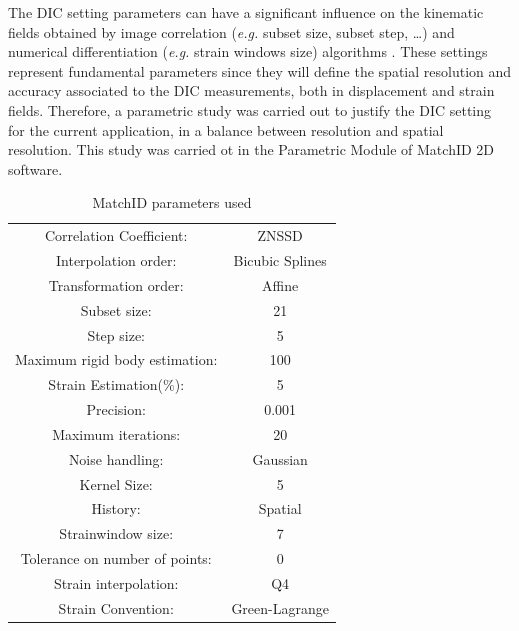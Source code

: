 \documentclass[3p,times,procedia]{elsarticle}
\begin{document}
The DIC setting parameters can have a significant influence on the kinematic fields obtained by image correlation (\textit{e.g.} subset size, subset step, \ldots) and numerical differentiation (\textit{e.g.} strain windows size) algorithms \cite{Pereira2018566}. These settings represent fundamental parameters since they will define the spatial resolution and accuracy associated to the DIC measurements, both in displacement and strain fields.  Therefore, a parametric study was carried out to justify the DIC setting for the current
application, in a balance between resolution and spatial resolution. This study was carried ot in the Parametric Module of MatchID 2D software.
\begin{table}[]
	\centering
	\begin{tabular}{c c}
		\hline
		Correlation   Coefficient: & ZNSSD \\ 
		Interpolation order: & Bicubic Splines \\ 
		Transformation order: & Affine \\
		Subset size: & 21 \\
		Step size: & 5 \\
		Maximum rigid body estimation: & 100 \\ 
		Strain Estimation(\%): & 5 \\ 
		Precision: & 0.001 \\ 
		Maximum iterations: & 20 \\ 
		Noise handling: & Gaussian \\ 
		Kernel Size: & 5 \\ 
		History: & Spatial \\ 
		Strainwindow size: & 7 \\ 
		Tolerance on number of points: & 0 \\ 
		Strain interpolation: & Q4 \\ 
		Strain Convention: & Green-Lagrange \\ \hline
	\end{tabular}
	\caption{MatchID parameters used}
	\label{tab:MatchID_param}
\end{table}
\end{document}

